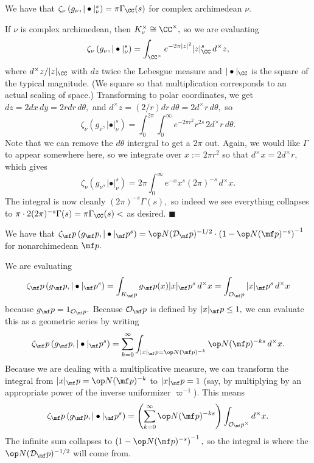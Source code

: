 \begin{lemma}
    We have that $\zeta_\nu\left(g_\nu,|\bullet|_\nu^s\right)=\pi\Gamma_\CC(s)$ for complex archimedean $\nu.$
\end{lemma}
If $\nu$ is complex archimedean, then $K_\nu^\times\cong\CC^\times,$ so we are evaluating
\[\zeta_\nu\left(g_\nu,|\bullet|_\nu^s\right)=\int_{\CC^\times}e^{-2\pi|z|^2}|z|_\CC^s\,d^\times z,\]
where $d^\times z/|z|_\CC$ with $dz$ twice the Lebesgue measure and $|\bullet|_\CC$ is the square of the typical magnitude. (We square so that multiplication corresponds to an actual scaling of space.) Transforming to polar coordinates, we get $dz=2dx\,dy=2rdr\,d\theta,$ and $d^\times z=(2/r)dr\,d\theta=2d^\times r\,d\theta,$ so
\[\zeta_\nu\left(g_\nu,|\bullet|_\nu^s\right)=\int_0^{2\pi}\int_0^\infty e^{-2\pi r^2}r^{2s}\,2d^\times r\,d\theta.\]
Note that we can remove the $d\theta$ intergral to get a $2\pi$ out. Again, we would like $\Gamma$ to appear somewhere here, so we integrate over $x:=2\pi r^2$ so that $d^\times x=2d^\times r,$ which gives
\[\zeta_\nu\left(g_\nu,|\bullet|_\nu^s\right)=2\pi\int_0^\infty e^{-x}x^s(2\pi)^{-s}\,d^\times x.\]
The integral is now cleanly $(2\pi)^{-s}\Gamma(s),$ so indeed we see everything collapses to $\pi\cdot2(2\pi)^{-s}\Gamma(s)=\pi\Gamma_\CC(s)<$ as desired. $\blacksquare$

\begin{lemma}
    We have that $\zeta_\mf p\left(g_\mf p,|\bullet|_\mf p^s\right)=\op N(\mathcal D_\mf p)^{-1/2}\cdot\left(1-\op N(\mf p)^{-s}\right)^{-1}$ for nonarchimedean $\mf p.$
\end{lemma}
We are evaluating
\[\zeta_\mf p\left(g_\mf p,|\bullet|_\mf p^s\right)=\int_{K_\mf p}g_\mf p(x)|x|_\mf p^s\,d^\times x=\int_{\mathcal O_\mf p}|x|_\mf p^s\,d^\times x\]
because $g_\mf p=1_{\mathcal O_\mf p}.$ Because $\mathcal O_\mf p$ is defined by $|x|_\mf p\le1,$ we can evaluate this as a geometric series by writing
\[\zeta_\mf p\left(g_\mf p,|\bullet|_\mf p^s\right)=\sum_{k=0}^\infty\int_{|x|_\mf p=\op N(\mf p)^{-k}}\op N(\mf p)^{-ks}\,d^\times x.\]
Because we are dealing with a multiplicative measure, we can transform the integral from $|x|_\mf p=\op N(\mf p)^{-k}$ to $|x|_\mf p=1$ (say, by multiplying by an appropriate power of the inverse uniformizer $\varpi^{-1}$). This means
\[\zeta_\mf p\left(g_\mf p,|\bullet|_\mf p^s\right)=\left(\sum_{k=0}^\infty\op N(\mf p)^{-ks}\right)\int_{\mathcal O_\mf p^\times}d^\times x.\]
The infinite sum collapses to $\left(1-\op N(\mf p)^{-s}\right)^{-1},$ so the integral is where the $\op N(\mathcal D_\mf p)^{-1/2}$ will come from.

